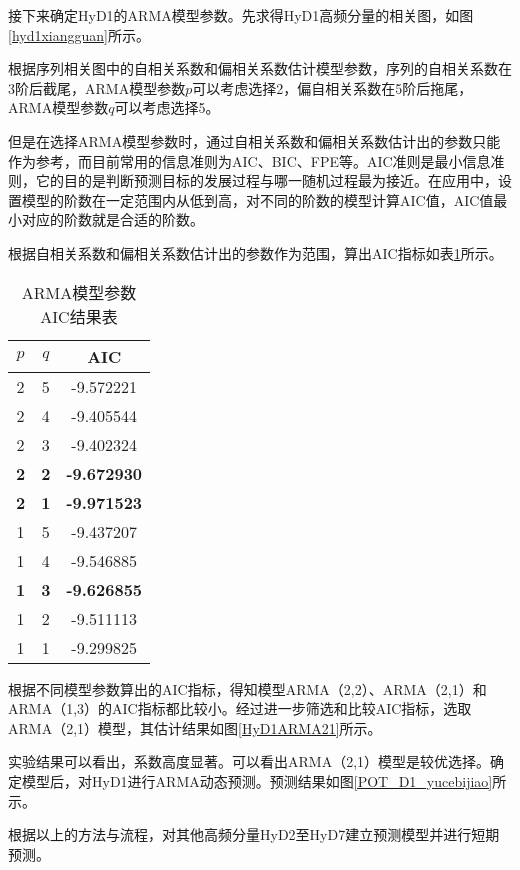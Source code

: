 接下来确定HyD1的ARMA模型参数。先求得HyD1高频分量的相关图，如图 \ref{hyd1xiangguan}所示。

根据序列相关图中的自相关系数和偏相关系数估计模型参数，序列的自相关系数在3阶后截尾，ARMA模型参数$p$可以考虑选择2，偏自相关系数在5阶后拖尾，ARMA模型参数$q$可以考虑选择5。

但是在选择ARMA模型参数时，通过自相关系数和偏相关系数估计出的参数只能作为参考，而目前常用的信息准则为AIC、BIC、FPE等。AIC准则是最小信息准则，它的目的是判断预测目标的发展过程与哪一随机过程最为接近。在应用中，设置模型的阶数在一定范围内从低到高，对不同的阶数的模型计算AIC值，AIC值最小对应的阶数就是合适的阶数。

根据自相关系数和偏相关系数估计出的参数作为范围，算出AIC指标如表\ref{tab:ARMA_AIC}所示。
\begin{table}[htbp] 
	\centering
	\caption{\label{tab:ARMA_AIC}ARMA模型参数AIC结果表} 
	\begin{tabular}{ccc} 
		\toprule 
		$p$ & $q$ & AIC\\ 
		\midrule
		2 & 5 &  -9.572221 \\
		2 & 4 &  -9.405544 \\
		2 & 3 &  -9.402324 \\
		\textbf{2} & \textbf{2} &  \textbf{-9.672930} \\
		\textbf{2} & \textbf{1} &  \textbf{-9.971523} \\
		1 & 5 &  -9.437207 \\
		1 & 4 &  -9.546885 \\
		\textbf{1} & \textbf{3} &  \textbf{-9.626855} \\
		1 & 2 &  -9.511113 \\
		1 & 1 &  -9.299825 \\
		\bottomrule 
	\end{tabular} 
\end{table}

根据不同模型参数算出的AIC指标，得知模型ARMA（2,2）、ARMA（2,1）和ARMA（1,3）的AIC指标都比较小。经过进一步筛选和比较AIC指标，选取ARMA（2,1）模型，其估计结果如图\ref{HyD1ARMA21}所示。

实验结果可以看出，系数高度显著。可以看出ARMA（2,1）模型是较优选择。确定模型后，对HyD1进行ARMA动态预测。预测结果如图\ref{POT_D1_yucebijiao}所示。

根据以上的方法与流程，对其他高频分量HyD2至HyD7建立预测模型并进行短期预测。

